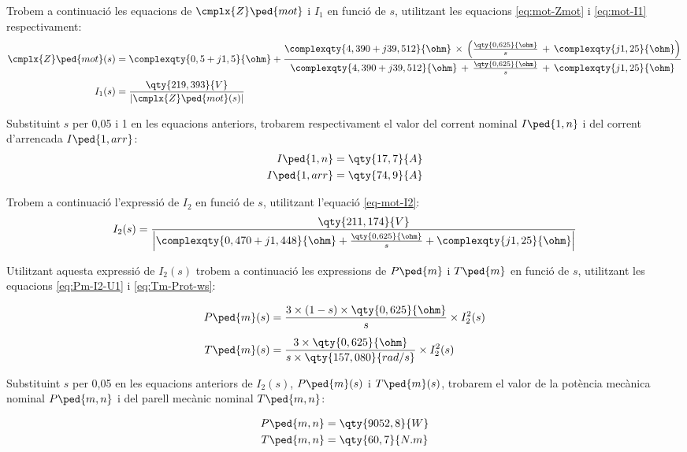 \begin{exemple}
 Trobem a continuació les equacions de $\cmplx{Z}\ped{mot}$ i $I_1$ en funció de $s$, utilitzant les equacions \eqref{eq:mot-Zmot} i \eqref{eq:mot-I1} respectivament:
    \begin{align*}
		\cmplx{Z}\ped{mot}(s) &= \complexqty{0,5+j1,5}{\ohm} + \frac{\complexqty{4,390+j39,512}{\ohm}\,\times\,
	      \left(\tfrac{\qty{0,625}{\ohm}}{s}\, + \, \complexqty{j1,25}{\ohm}\right)}{\complexqty{4,390+j39,512}{\ohm}\,+\,
	   \tfrac{\qty{0,625}{\ohm}}{s}\, + \,\complexqty{j1,25}{\ohm}} \\[0.5ex]
   		I_1(s)  &= \frac{\qty{219,393}{V}}{|\cmplx{Z}\ped{mot}(s)|}  
	\end{align*} 
 
    Substituint $s$ per 0,05 i 1 en les equacions anteriors, trobarem respectivament el valor del corrent nominal $I\ped{1,n}$ i del corrent d'arrencada $I\ped{1,arr}$:
    \begin{align*}
        I\ped{1,n} &= \qty{17,7}{A} \\
        I\ped{1,arr} &= \qty{74,9}{A}
    \end{align*}
    
    Trobem a continuació l'expressió de $I_2$ en funció de $s$, utilitzant l'equació \eqref{eq-mot-I2}:
    \[
        I_2(s) = \frac{\qty{211,174}{V}}{\left| \complexqty{0,470+j1,448}{\ohm} + \frac{\qty{0,625}{\ohm}}{s} + \complexqty{j1,25}{\ohm} \right|}
    \]

    Utilitzant aquesta expressió de $I_2(s)$ trobem a continuació les expressions de $P\ped{m}$ i $T\ped{m}$ en funció de $s$, utilitzant les equacions \eqref{eq:Pm-I2-U1} i \eqref{eq:Tm-Prot-ws}:
    
     \begin{align*}
        P\ped{m}(s) &=\frac{ 3\times (1-s)\times \qty{0,625}{\ohm} }{s} \times  I_2^2(s) \\[1ex]
        T\ped{m}(s)  &=  \frac{3\times \qty{0,625}{\ohm}}{s\times \qty{157,080}{rad/s}} \times  I_2^2(s)
    \end{align*}

     Substituint $s$ per 0,05  en les equacions anteriors de $I_2(s)$, $P\ped{m}(s)$ i $T\ped{m}(s)$, trobarem el valor de la potència mecànica nominal $P\ped{m,n}$ i del parell mecànic nominal $T\ped{m,n}$:
     
     \begin{align*}
        P\ped{m,n} &= \qty{9052,8}{W} \\
         T\ped{m,n} &= \qty{60,7}{N.m} 
    \end{align*}   
    

\end{exemple}
